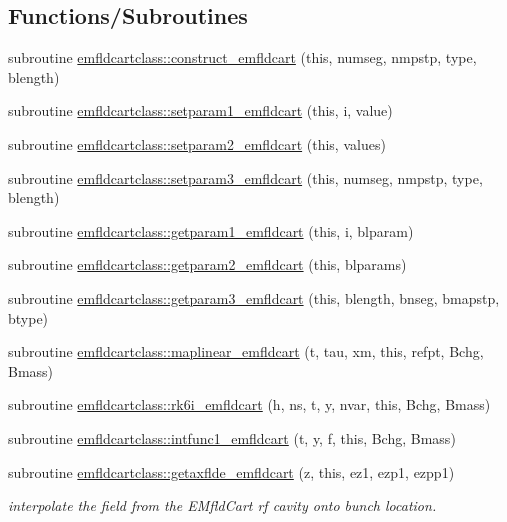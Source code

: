 \subsection*{Functions/\+Subroutines}
\begin{DoxyCompactItemize}
\item 
subroutine \mbox{\hyperlink{namespaceemfldcartclass_a22c8117844df69d19834c91595060930}{emfldcartclass\+::construct\+\_\+emfldcart}} (this, numseg, nmpstp, type, blength)
\item 
subroutine \mbox{\hyperlink{namespaceemfldcartclass_a667f3b95239a56c59438d7645e902471}{emfldcartclass\+::setparam1\+\_\+emfldcart}} (this, i, value)
\item 
subroutine \mbox{\hyperlink{namespaceemfldcartclass_a49c36692c057476c17ea403564e4f057}{emfldcartclass\+::setparam2\+\_\+emfldcart}} (this, values)
\item 
subroutine \mbox{\hyperlink{namespaceemfldcartclass_a1091548d2fbca6e19b3861f96b834bfc}{emfldcartclass\+::setparam3\+\_\+emfldcart}} (this, numseg, nmpstp, type, blength)
\item 
subroutine \mbox{\hyperlink{namespaceemfldcartclass_ab81f3e948555a34e9f3e6dd08fb8d7c8}{emfldcartclass\+::getparam1\+\_\+emfldcart}} (this, i, blparam)
\item 
subroutine \mbox{\hyperlink{namespaceemfldcartclass_a0e3252de98b5d0c5318b5cdccb878b21}{emfldcartclass\+::getparam2\+\_\+emfldcart}} (this, blparams)
\item 
subroutine \mbox{\hyperlink{namespaceemfldcartclass_af5ef093e045d499ae731aad8612e6333}{emfldcartclass\+::getparam3\+\_\+emfldcart}} (this, blength, bnseg, bmapstp, btype)
\item 
subroutine \mbox{\hyperlink{namespaceemfldcartclass_a4be4286a2e0f37f64d5fd1973fe73f39}{emfldcartclass\+::maplinear\+\_\+emfldcart}} (t, tau, xm, this, refpt, Bchg, Bmass)
\item 
subroutine \mbox{\hyperlink{namespaceemfldcartclass_a2d6f42bcd880ec225920c8179e292af6}{emfldcartclass\+::rk6i\+\_\+emfldcart}} (h, ns, t, y, nvar, this, Bchg, Bmass)
\item 
subroutine \mbox{\hyperlink{namespaceemfldcartclass_a2a33c1d59a306651080d563b98b844e7}{emfldcartclass\+::intfunc1\+\_\+emfldcart}} (t, y, f, this, Bchg, Bmass)
\item 
subroutine \mbox{\hyperlink{namespaceemfldcartclass_a98959709716076ee10dea98be7a2243c}{emfldcartclass\+::getaxflde\+\_\+emfldcart}} (z, this, ez1, ezp1, ezpp1)
\begin{DoxyCompactList}\small\item\em interpolate the field from the E\+Mfld\+Cart rf cavity onto bunch location. \end{DoxyCompactList}\item 

\end{DoxyCompactItemize}
